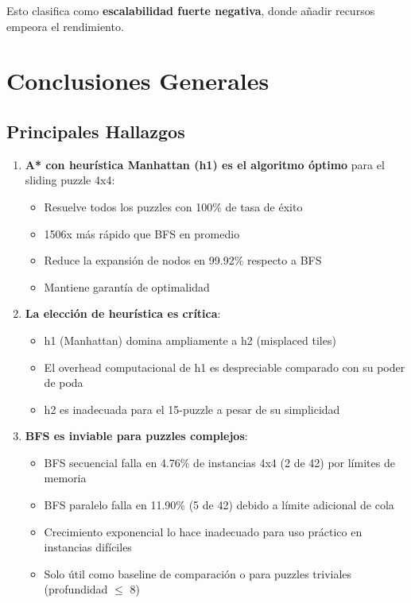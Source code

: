 \documentclass[12pt,a4paper]{article}
\begin{document}
Esto clasifica como \textbf{escalabilidad fuerte negativa}, donde añadir recursos empeora el rendimiento.

\section{Conclusiones Generales}

\subsection{Principales Hallazgos}

\begin{enumerate}
    \item \textbf{A* con heurística Manhattan (h1) es el algoritmo óptimo} para el sliding puzzle 4x4:
    \begin{itemize}
        \item Resuelve todos los puzzles con 100\% de tasa de éxito
        \item 1506x más rápido que BFS en promedio
        \item Reduce la expansión de nodos en 99.92\% respecto a BFS
        \item Mantiene garantía de optimalidad
    \end{itemize}
    
    \item \textbf{La elección de heurística es crítica}:
    \begin{itemize}
        \item h1 (Manhattan) domina ampliamente a h2 (misplaced tiles)
        \item El overhead computacional de h1 es despreciable comparado con su poder de poda
        \item h2 es inadecuada para el 15-puzzle a pesar de su simplicidad
    \end{itemize}
    
    \item \textbf{BFS es inviable para puzzles complejos}:
    \begin{itemize}
        \item BFS secuencial falla en 4.76\% de instancias 4x4 (2 de 42) por límites de memoria
        \item BFS paralelo falla en 11.90\% (5 de 42) debido a límite adicional de cola
        \item Crecimiento exponencial lo hace inadecuado para uso práctico en instancias difíciles
        \item Solo útil como baseline de comparación o para puzzles triviales (profundidad $\leq$ 8)
    \end{itemize}
    

\end{enumerate}
\end{document}
